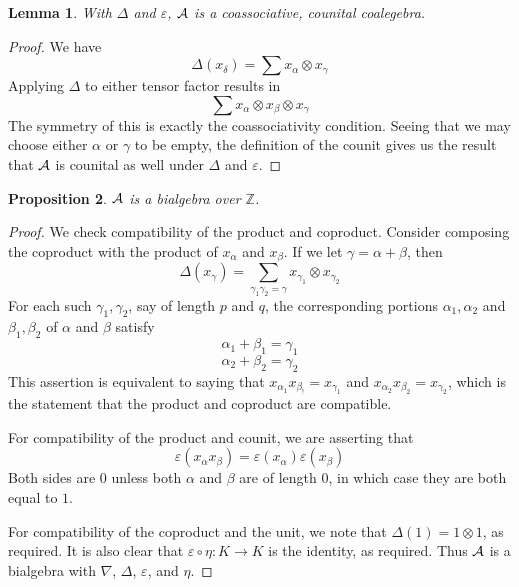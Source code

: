 \documentclass{elsarticle}
\newtheorem{lemma}{Lemma}[section]
\newtheorem{proposition}[lemma]{Proposition}
\theoremstyle{definition}
\theoremstyle{remark}
\numberwithin{equation}{subsection}
\begin{document}
\begin{lemma}
	With $\Delta$ and $\varepsilon$, $\mathcal{A}$ is a coassociative, counital coalegebra.
\end{lemma}
\begin{proof}
	We have 
	$$\Delta(x_\delta)=\sum x_\alpha\otimes x_\gamma$$
	Applying $\Delta$ to either tensor factor results in
	$$\sum x_\alpha\otimes x_\beta\otimes x_\gamma$$
	The symmetry of this is exactly the coassociativity condition. Seeing that we may choose either $\alpha$ or $\gamma$ to be empty, the definition of the counit gives us the result that $\mathcal{A}$ is counital as well under $\Delta$ and $\varepsilon$.
\end{proof}


%	

\begin{proposition}
	$\mathcal{A}$ is a bialgebra over $\mathbb{Z}$.
\end{proposition}
\begin{proof}

We check compatibility of the product and coproduct. Consider composing the coproduct with the product of $x_\alpha$ and $x_\beta$. If we let $\gamma = \alpha+\beta$, then
$$\Delta(x_\gamma) = \sum_{\gamma_1\gamma_2=\gamma}x_{\gamma_1}\otimes x_{\gamma_2}$$
For each such $\gamma_1,\gamma_2$, say of length $p$ and $q$, the corresponding portions $\alpha_1,\alpha_2$ and $\beta_1,\beta_2$ of $\alpha$ and $\beta$ satisfy
$$\alpha_1+\beta_1=\gamma_1$$
$$\alpha_2+\beta_2=\gamma_2$$
This assertion is equivalent to saying that $x_{\alpha_1}x_{\beta_!}=x_{\gamma_1}$ and $x_{\alpha_2}x_{\beta_2} = x_{\gamma_2}$, which is the statement that the product and coproduct are compatible.

For compatibility of the product and counit, we are asserting that 
$$\varepsilon(x_\alpha x_\beta) = \varepsilon(x_\alpha)\varepsilon(x_\beta)$$
Both sides are $0$ unless both $\alpha$ and $\beta$ are of length $0$, in which case they are both equal to $1$.

For compatibility of the coproduct and the unit, we note that $\Delta(1) = 1\otimes 1$, as required. It is also clear that $\varepsilon\circ \eta:K\to K$ is the identity, as required. Thus $\mathcal{A}$ is a bialgebra with $\nabla$, $\Delta$, $\varepsilon$, and $\eta$.
	
\end{proof}
\end{document}
